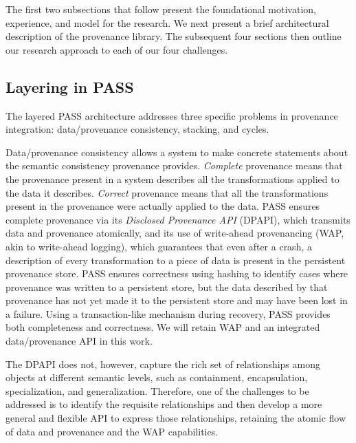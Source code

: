 \documentclass[10pt]{article}
\begin{document}
The first two subsections that follow present the foundational motivation,
experience, and model for the research.
We next present a brief architectural description of the provenance library.
The subsequent four sections then outline our research approach to
each of our four challenges.

\subsection{Layering in PASS}
\label{sec:pass}

The layered PASS architecture addresses three specific problems in
provenance integration: data/provenance consistency, stacking,
and cycles.

Data/provenance consistency allows a system to make concrete statements
about the semantic consistency provenance provides.
\emph{Complete} provenance means that the provenance present in a
system describes all the transformations applied to the data it describes.
\emph{Correct} provenance means that all the transformations present in
the provenance were actually applied to the data.
PASS ensures complete provenance via its \emph{Disclosed Provenance API}
(DPAPI), which transmits data and provenance atomically, and its use of
write-ahead provenancing (WAP, akin to write-ahead logging), which guarantees
that even after a crash, a description of every transformation to a piece of
data is present in the persistent provenance store.
PASS ensures correctness using hashing to identify cases where provenance
was written to a persistent store, but the data described by that provenance
has not yet made it to the persistent store and may have been lost in a
failure.
Using a transaction-like mechanism during recovery, PASS provides
both completeness and correctness.
We will retain WAP and an integrated data/provenance API in this work.

The DPAPI does not, however, capture the rich set of relationships
among objects at different semantic levels, such as containment,
encapsulation, specialization, and generalization.
Therefore, one of the challenges to be addressed is to identify the
requisite relationships and then develop
a more general and flexible API to express those relationships,
retaining the atomic flow of data and provenance and the WAP capabilities.

\end{document}

